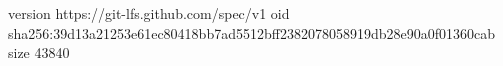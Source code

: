 version https://git-lfs.github.com/spec/v1
oid sha256:39d13a21253e61ec80418bb7ad5512bff2382078058919db28e90a0f01360cab
size 43840
